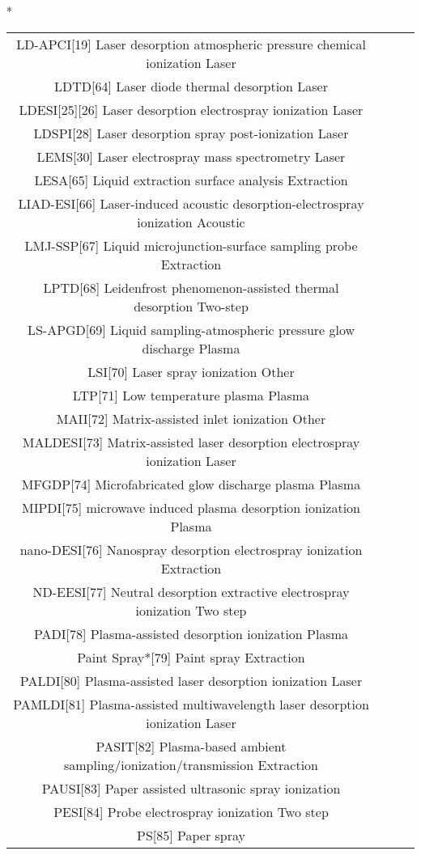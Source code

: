 \begin{table}{*}
\begin{tabular}{|c|c|c|l|}
LD-APCI[19] Laser desorption atmospheric pressure chemical ionization Laser \\
LDTD[64] Laser diode thermal desorption Laser \\
LDESI[25][26] Laser desorption electrospray ionization Laser \\
LDSPI[28] Laser desorption spray post-ionization Laser \\ 
LEMS[30] Laser electrospray mass spectrometry Laser \\
LESA[65] Liquid extraction surface analysis Extraction \\
LIAD-ESI[66] Laser-induced acoustic desorption-electrospray ionization Acoustic \\
LMJ-SSP[67] Liquid microjunction-surface sampling probe Extraction \\
LPTD[68] Leidenfrost phenomenon-assisted thermal desorption Two-step \\
LS-APGD[69] Liquid sampling-atmospheric pressure glow discharge Plasma \\
LSI[70] Laser spray ionization Other \\
LTP[71] Low temperature plasma Plasma \\
MAII[72] Matrix-assisted inlet ionization Other \\
MALDESI[73] Matrix-assisted laser desorption electrospray ionization Laser \\
MFGDP[74] Microfabricated glow discharge plasma Plasma \\
MIPDI[75] microwave induced plasma desorption ionization Plasma \\
nano-DESI[76] Nanospray desorption electrospray ionization Extraction \\
ND-EESI[77] Neutral desorption extractive electrospray ionization Two step \\
PADI[78] Plasma-assisted desorption ionization Plasma \\
Paint Spray*[79] Paint spray Extraction \\
PALDI[80] Plasma-assisted laser desorption ionization Laser \\
PAMLDI[81] Plasma-assisted multiwavelength laser desorption ionization Laser \\
PASIT[82] Plasma-based ambient sampling/ionization/transmission Extraction \\
PAUSI[83] Paper assisted ultrasonic spray ionization  \\
PESI[84] Probe electrospray ionization Two step \\
PS[85] Paper spray  \\

\end{tabular}
\end{table}
